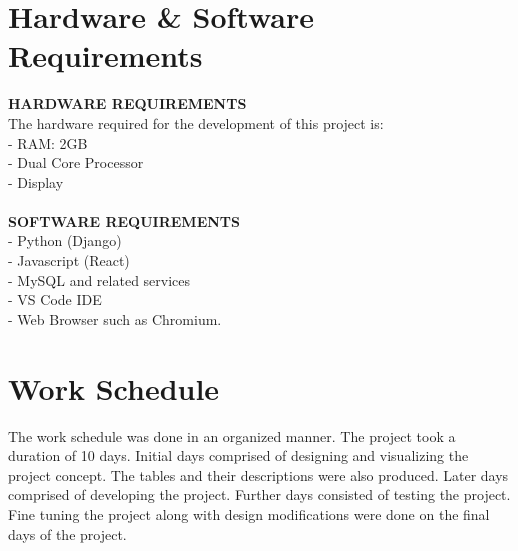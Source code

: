 \documentclass[11pt]{report}
\begin{document}
\section{Hardware \& Software Requirements}
\textbf{HARDWARE REQUIREMENTS} \\
The hardware required for the development of this project is:\\
- RAM: 2GB \\
- Dual Core Processor \\
- Display \\
\\\textbf{SOFTWARE REQUIREMENTS}\\
- Python (Django) \\
- Javascript (React)\\
- MySQL and related services \\
- VS Code IDE \\
- Web Browser such as Chromium.\\

\section{Work Schedule}
The work schedule was done in an organized manner. The project took a duration of 10 days. Initial days comprised of designing and visualizing the project concept. The tables and their descriptions were also produced. Later days comprised of developing the project. Further days consisted of testing the project. Fine tuning the project along with design modifications were done on the final days of the project.
\end{document}
